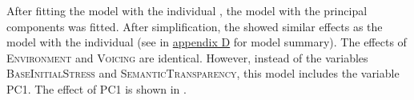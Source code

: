     \begin{table}
    	\caption{ Summary of linear model for variables predicting the relative  duration of [s] in prefixed words with voiceless /s/}
    	\label{tbl: summary model7}
    	
    	
    \end{table}



After fitting the model with the individual , the model with the principal components was fitted. After simplification, the  showed similar effects as the model with the individual  (see  in \hyperref[Appendix D: model summaries corpus]{appendix D} for model summary). The effects of \textsc{Environment} and \textsc{Voicing} are identical. However, instead of the variables \textsc{BaseInitialStress} and \textsc{SemanticTransparency}, this model includes the variable \textsc{PC1}. 
The effect of \textsc{PC1} is shown in . 



